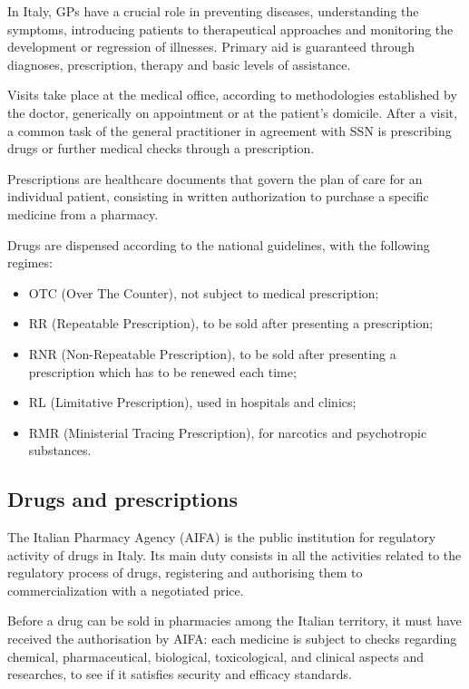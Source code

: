 In Italy, GPs have a crucial role in preventing diseases, understanding the symptoms, introducing patients to therapeutical approaches and monitoring the development or regression of illnesses\cite{gp}. Primary aid is guaranteed through diagnoses, prescription, therapy and basic levels of assistance.

Visits take place at the medical office, according to methodologies established by the doctor, generically on appointment or at the patient's domicile. After a visit, a common task of the general practitioner in agreement with SSN is prescribing drugs or further medical checks through a prescription.

Prescriptions are healthcare documents that govern the plan of care for an individual patient\cite{ascpt}, consisting in written authorization to purchase a specific medicine from a pharmacy.

Drugs are dispensed according to the national guidelines\cite{ricette}, with the following regimes:
\begin{itemize}
	\item OTC (Over The Counter), not subject to medical prescription;
	\item RR (Repeatable Prescription), to be sold after presenting a prescription;
	\item RNR (Non-Repeatable Prescription), to be sold after presenting a prescription which has to be renewed each time;
	\item RL (Limitative Prescription), used in hospitals and clinics;
	\item RMR (Ministerial Tracing Prescription), for narcotics and psychotropic substances.
\end{itemize}

\subsection{Drugs and prescriptions}  
The Italian Pharmacy Agency (AIFA) is the public institution for regulatory activity of drugs in Italy. Its main duty consists in all the activities related to the regulatory process of drugs, registering and authorising them to commercialization with a negotiated price. 

Before a drug can be sold in pharmacies among the Italian territory, it must have received the authorisation by AIFA: each medicine is subject to checks regarding chemical, pharmaceutical, biological, toxicological, and clinical aspects and researches, to see if it satisfies security and efficacy standards\cite{aic}.

